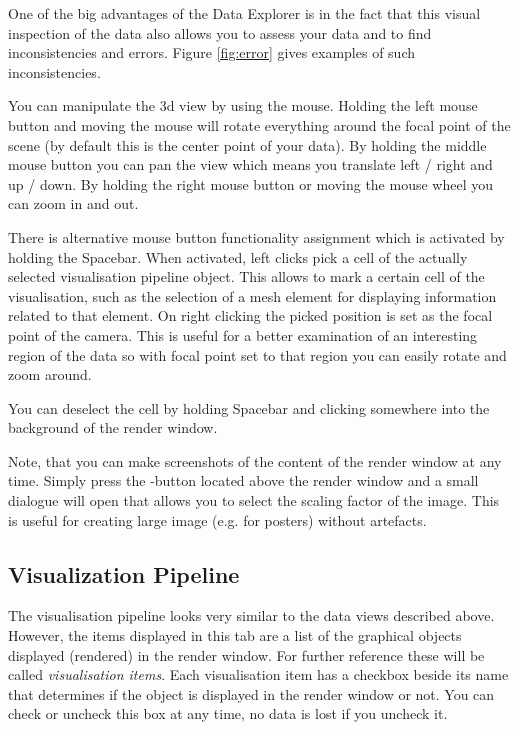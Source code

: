 One of the big advantages of the Data Explorer is in the fact that this visual inspection of the data also allows you to assess your data and to find inconsistencies and errors. Figure \ref{fig:error} gives examples of such inconsistencies.

You can manipulate the 3d view by using the mouse. Holding the left mouse button and moving the mouse will rotate everything around the focal point of the scene (by default this is the center point of your data). By holding the middle mouse button you can pan the view which means you translate left / right and up / down. By holding the right mouse button or moving the mouse wheel you can zoom in and out.

There is alternative mouse button functionality assignment which is activated by holding the Spacebar. When activated, left clicks pick a cell of the actually selected visualisation pipeline object. This allows to mark a certain cell of the visualisation, such as the selection of a mesh element for displaying information related to that element. On right clicking the picked position is set as the focal point of the camera. This is useful for a better examination of an interesting region of the data so with focal point set to that region you can easily rotate and zoom around.

You can deselect the cell by holding Spacebar and clicking somewhere into the background of the render window.

\bigskip

Note, that you can make screenshots of the content of the render window at any time. Simply press the -button located above the render window and a small dialogue will open that allows you to select the scaling factor of the image. This is useful for creating large image (e.g. for posters) without artefacts.

\subsection{Visualization Pipeline}

The visualisation pipeline looks very similar to the data views described above. However, the items displayed in this tab are a list of the graphical objects displayed (rendered) in the render window. For further reference these will be called \emph{visualisation items}. Each visualisation item has a checkbox beside its name that determines if the object is displayed in the render window or not. You can check or uncheck this box at any time, no data is lost if you uncheck it.

